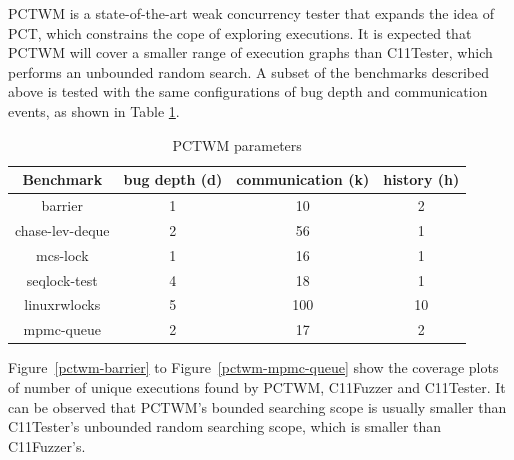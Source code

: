 PCTWM \cite{pctwm} is a state-of-the-art weak concurrency tester that expands the idea of PCT, which constrains the cope of exploring executions. It is expected that PCTWM will cover a smaller range of execution graphs than C11Tester, which performs an unbounded random search. A subset of the benchmarks described above is tested with the same configurations of bug depth and communication events, as shown in Table \ref{pctwm-configs}.

\begin{table}[h]
	\centering
	\begin{tabular}{ |c|ccc| }
		\hline
		Benchmark       & bug depth (d) & communication (k) & history (h) \\
		\hline
		barrier         & 1             & 10                & 2           \\
		chase-lev-deque & 2             & 56                & 1           \\
		mcs-lock        & 1             & 16                & 1           \\
		seqlock-test    & 4             & 18                & 1           \\
		linuxrwlocks    & 5             & 100               & 10          \\
		mpmc-queue      & 2             & 17                & 2           \\
		\hline
	\end{tabular}
	\caption{PCTWM parameters}
	\label{pctwm-configs}
\end{table}

Figure~\ref{pctwm-barrier} to Figure~\ref{pctwm-mpmc-queue} show the coverage plots of number of unique executions found by PCTWM, C11Fuzzer and C11Tester. It can be observed that PCTWM's bounded searching scope is usually smaller than C11Tester's unbounded random searching scope, which is smaller than C11Fuzzer's.

